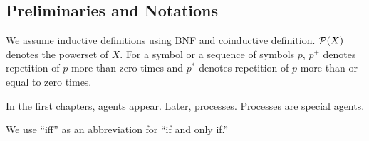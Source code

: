   \subsection{Preliminaries and Notations}

  We assume inductive definitions using BNF and coinductive definition.
  ${\mathcal P({X})}$ denotes the powerset of $X$.
  For a symbol or a sequence of symbols $p$,
  $p^+$ denotes repetition of $p$ more than zero times and
  $p^*$ denotes repetition of $p$ more than or equal to zero times.

  In the first chapters, agents appear.  Later, processes.  Processes
  are special agents.





We use ``iff'' as an abbreviation for ``if and only if.''